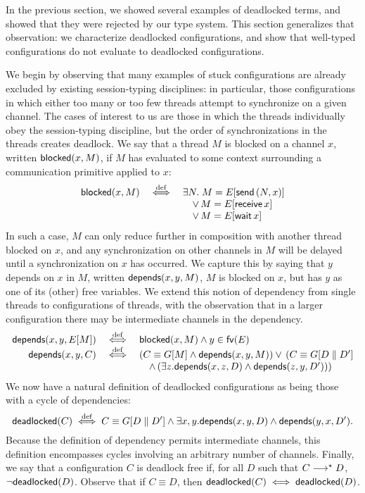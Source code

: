 \documentclass[orivec,envcountsame]{llncs}
\begin{document}
In the previous section, we showed several examples of deadlocked terms, and showed that they were
rejected by our type system.  This section generalizes that observation: we characterize deadlocked
configurations, and show that well-typed configurations do not evaluate to deadlocked
configurations.

We begin by observing that many examples of stuck configurations are already excluded by existing
session-typing disciplines: in particular, those configurations in which either too many or too few
threads attempt to synchronize on a given channel.  The cases of interest to us are those in which
the threads individually obey the session-typing discipline, but the order of synchronizations in
the threads creates deadlock.  We say that a thread $M$ is blocked on a channel $x$, written
$\mathsf{blocked}(x,M)$, if $M$ has evaluated to some context surrounding a communication primitive applied
to $x$:
%
\[\begin{array}{rcl}
  \mathsf{blocked}(x,M) &\stackrel{\mathrm{def}}{\iff}& \exists N. \; M = E[\mathsf{send} \, (N,x)] \\
  && \quad \lor \, M = E[\mathsf{receive} \, x] \\
  && \quad \lor \, M = E[\mathsf{wait} \, x]
\end{array}\]
%
In such a case, $M$ can only reduce further in composition with another thread blocked on $x$, and
any synchronization on other channels in $M$ will be delayed until a synchronization on $x$ has
occurred.  We capture this by saying that $y$ depends on $x$ in $M$, written $\mathsf{depends}(x,y,M)$, $M$ is
blocked on $x$, but has $y$ as one of its (other) free variables.  We extend this notion of
dependency from single threads to configurations of threads, with the observation that in a larger
configuration there may be intermediate channels in the dependency.
\[\begin{array}{rcl}
  \mathsf{depends}(x,y,E[M]) &\stackrel{\mathrm{def}}{\iff}& \mathsf{blocked}(x,M) \land y \in \mathsf{fv}(E) \\
  \mathsf{depends}(x,y,C) &\stackrel{\mathrm{def}}{\iff}& (C \equiv G[M] \land \mathsf{depends}(x,y,M)) \lor \, (C \equiv G[D \parallel D'] \\
  && \quad \land \, (\exists z. \mathsf{depends}(x,z,D) \land \mathsf{depends}(z,y,D')))
\end{array}\]
%
We now have a natural definition of deadlocked configurations as being those with a cycle of
dependencies:
%
\[
\mathsf{deadlocked}(C) \stackrel{\mathrm{def}}{\iff} C \equiv G[D \parallel D'] \land \exists x,y. \mathsf{depends}(x,y,D) \land \mathsf{depends}(y,x,D').
\]
%
Because the definition of dependency permits intermediate channels, this definition encompasses
cycles involving an arbitrary number of channels.  Finally, we say that a configuration $C$ is
deadlock free if, for all $D$ such that $C \longrightarrow^\star D$, $\lnot\mathsf{deadlocked}(D)$.  Observe that if
$C \equiv D$, then $\mathsf{deadlocked}(C) \iff \mathsf{deadlocked}(D)$.
\end{document}
